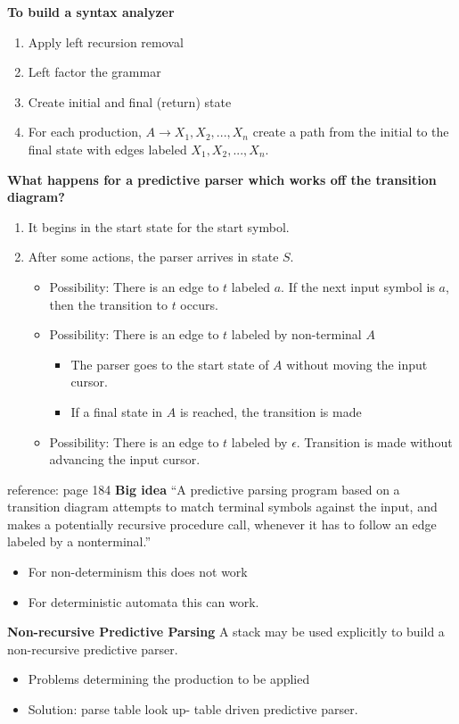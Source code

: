 \documentclass[11pt]{article}
\begin{document}
\textbf{\Large To build a syntax analyzer}
\begin{enumerate}
\item Apply left recursion removal
\item Left factor the grammar 
\item Create initial and final (return) state
\item For each production, $A\to X_1, X_2, ..., X_n$ create a path from the initial to the final state with edges labeled $X_1, X_2, ..., X_n$.  
\end{enumerate}

\textbf{ \Large What happens for a predictive parser which works off the transition diagram?}
\begin{enumerate}
\item It begins in the start state for the start symbol.
\item After some actions, the parser arrives in state $S$.
\begin{itemize}
\item Possibility: There is an edge to $t$ labeled $a$.  If the next input symbol is $a$, then the transition to $t$ occurs.  
\item Possibility: There is an edge to $t$ labeled by non-terminal $A$
\begin{itemize}
\item The parser goes to the start state of $A$ without moving the input cursor.
\item If a final state in $A$ is reached, the transition is made
\end{itemize}
\item Possibility: There is an edge to $t$ labeled by $\epsilon$.  Transition is made without advancing the input cursor. 
\end{itemize}

\end{enumerate}


reference: page 184
\textbf {Big idea} ``A predictive parsing program based on a transition diagram attempts to match terminal symbols against the input, and makes a potentially recursive procedure call, whenever it has to follow an edge labeled by a nonterminal.''
\begin{itemize}
\item For non-determinism this does not work
\item For deterministic automata this can work.
\end{itemize}

\textbf {Non-recursive Predictive Parsing}
A stack may be used explicitly to build a non-recursive predictive parser.
\begin{itemize}
\item Problems determining the production to be applied 
\item Solution: parse table look up- table driven predictive parser.
\end{itemize}
\end{document}
